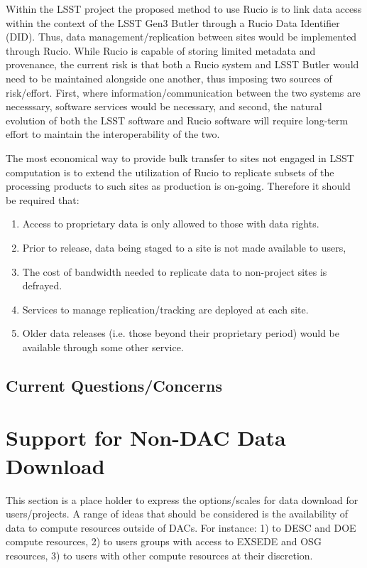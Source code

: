Within the LSST project the proposed method to use Rucio is to link data access within the context of the LSST Gen3 Butler 
through a Rucio Data Identifier (DID).  Thus, data management/replication between sites would be implemented through Rucio.  
While Rucio is capable of storing limited metadata and provenance, the current risk is that both a Rucio system and LSST Butler would
need to be maintained alongside one another, thus imposing two sources of risk/effort.  First, where information/communication
between the two systems are necesssary, software services would be necessary, and second, the natural evolution of both
the LSST software and Rucio software will require long-term effort to maintain the interoperability of the two.

The most economical way to provide bulk transfer to sites not engaged in LSST computation is to extend the utilization of Rucio to 
replicate subsets of the processing products to such sites as production is on-going.  Therefore it should be required that:
\begin{enumerate}
\item Access to proprietary data is only allowed to those with data rights.
\item Prior to release, data being staged to a site is not made available to users,
\item The cost of bandwidth needed to replicate data to non-project sites is defrayed.
\item Services to manage replication/tracking are deployed at each site.
\item Older data releases (i.e. those beyond their proprietary period) would be available through some other service.
\end{enumerate}

\subsection{Current Questions/Concerns}


\section{Support for Non-DAC Data Download\label{sec_users}}

This section is a place holder to express the options/scales for data download for users/projects.
A range of ideas that should be considered is the availability of data to compute resources outside of DACs.
For instance: 1) to DESC and DOE compute resources, 2) to users groups with access to EXSEDE and OSG 
resources, 3) to users with other compute resources at their discretion.






